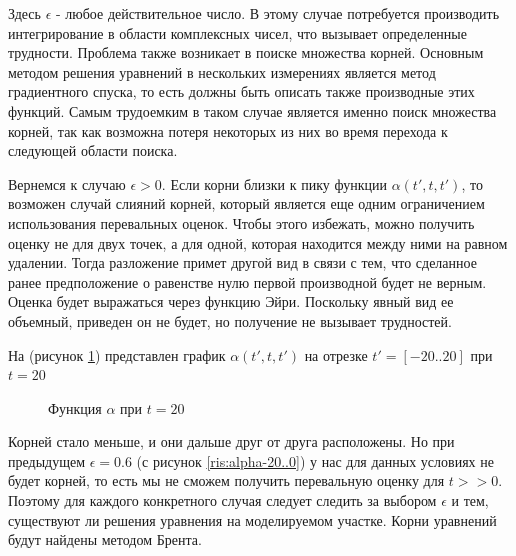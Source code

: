 \documentclass[14pt, a4paper]{article}
\numberwithin{figure}{section}
\numberwithin{equation}{section}
\newcommand{\sectionbreak}{\clearpage}
\begin{document}
Здесь $\epsilon$ - любое действительное число. В этому случае потребуется производить интегрирование в области комплексных чисел, что вызывает определенные трудности. Проблема также возникает в поиске множества корней. Основным методом решения уравнений в нескольких измерениях является метод градиентного спуска, то есть должны быть описать также производные этих функций. Самым трудоемким в таком случае является именно поиск множества корней, так как возможна потеря некоторых из них во время перехода к следующей области поиска.

Вернемся к случаю $\epsilon > 0$. Если корни близки к пику функции $\alpha(t', t, t')$, то возможен случай слияний корней, который является еще одним ограничением использования перевальных оценок.
Чтобы этого избежать, можно получить оценку не для двух точек, а для одной, которая находится между ними на равном удалении.
Тогда разложение примет другой вид в связи с тем, что сделанное ранее предположение о равенстве нулю первой производной будет не верным. Оценка будет выражаться через функцию Эйри.\cite{spec} Поскольку явный вид ее объемный, приведен он не будет, но получение не вызывает трудностей.

На (рисунок \ref{ris:alpha-20..20}) представлен график $\alpha(t', t, t')$ на отрезке $t' = [-20..20]$ при $t = 20$ 

\begin{figure}[h]
	\caption{Функция $\alpha$ при $t = 20$}
	\label{ris:alpha-20..20}
\end{figure}

Корней стало меньше, и они дальше друг от друга расположены. Но при предыдущем $\epsilon = 0.6$ (с рисунок \ref{ris:alpha-20..0}) у нас для данных условиях не будет корней, то есть мы не сможем получить перевальную оценку для $t>>0$.
Поэтому для каждого конкретного случая следует следить за выбором $\epsilon$ и тем, существуют ли решения уравнения на моделируемом участке.
Корни уравнений будут найдены методом Брента. \cite{tarasevych}
\sectionbreak
\end{document}
